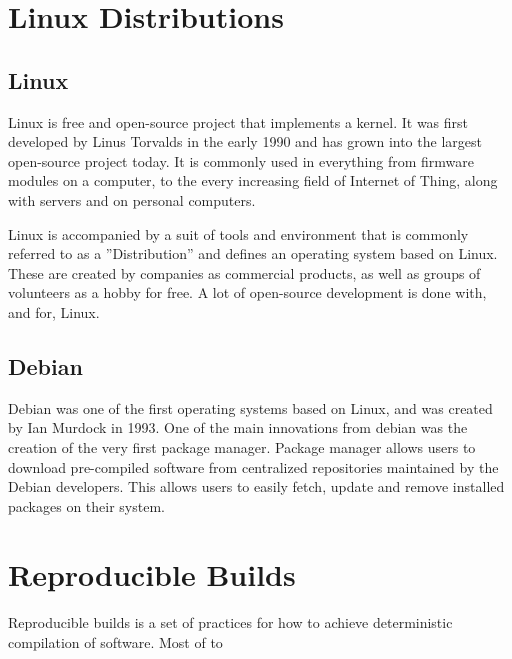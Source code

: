 \documentclass[../Main/thesis.tex]{subfiles}
\begin{document}
\section{Linux Distributions}\label{sec:linux_distributions}
    \subsection*{Linux}
    Linux is free and open-source project that implements a kernel. It was first
    developed by Linus Torvalds in the early 1990 and has grown into the largest
    open-source project today. It is commonly used in everything from firmware
    modules on a computer, to the every increasing field of Internet of Thing,
    along with servers and on personal computers.

    Linux is accompanied by a suit of tools and environment that is commonly
    referred to as a ''Distribution'' and defines an operating system based on
    Linux. These are created by companies as commercial products, as well as
    groups of volunteers as a hobby for free. A lot of open-source development
    is done with, and for, Linux.

    \subsection*{Debian}
    Debian was one of the first operating systems based on Linux, and was
    created by Ian Murdock in 1993. One of the main innovations from debian was
    the creation of the very first package manager. Package manager allows users
    to download pre-compiled software from centralized repositories maintained
    by the Debian developers.  This allows users to easily fetch, update and
    remove installed packages on their system.



\section{Reproducible Builds}\label{sec:reproducible_builds}

    Reproducible builds is a set of practices for how to achieve deterministic
    compilation of software. Most of to


\end{document}
